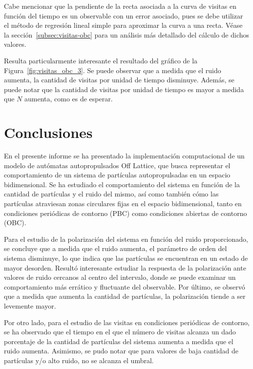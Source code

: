 \documentclass[11pt, a4paper]{article}
\begin{document}
            Cabe mencionar que la pendiente de la recta asociada a la curva de visitas en función del tiempo es un
            observable con un error asociado, pues se debe utilizar el método de regresión lineal simple para aproximar
            la curva a una recta.
            Véase la sección~\ref{subsec:visitas-obc} para un análisis más detallado del cálculo de dichos valores.

            Resulta particularmente interesante el resultado del gráfico de la Figura~\ref{fig:visitas_obc_3}.
            Se puede observar que a medida que el ruido aumenta, la cantidad de visitas por unidad de tiempo disminuye.
            Además, se puede notar que la cantidad de visitas por unidad de tiempo es mayor a medida que $N$ aumenta,
            como es de esperar.

    \newpage

    \section{Conclusiones}
    \label{sec:conclusiones}

        En el presente informe se ha presentado la implementación computacional de un modelo de autómatas autopropulsados
        Off Lattice, que busca representar el comportamiento de un sistema de partículas autopropulsadas en un espacio
        bidimensional.
        Se ha estudiado el comportamiento del sistema en función de la cantidad de partículas y el ruido del mismo, así como
        también cómo las partículas atraviesan zonas circulares fijas en el espacio bidimensional, tanto en condiciones
        periódicas de contorno (PBC) como condiciones abiertas de contorno (OBC).

        Para el estudio de la polarización del sistema en función del ruido proporcionado, se concluye que a medida que
        el ruido aumenta, el parámetro de orden del sistema disminuye, lo que indica que las partículas se encuentran en
        un estado de mayor desorden.
        Resultó interesante estudiar la respuesta de la polarización ante valores de ruido cercanos al centro del
        intervalo, donde se puede examinar un comportamiento más errático y fluctuante del observable.
        Por último, se observó que a medida que aumenta la cantidad de partículas, la polarización tiende a ser
        levemente mayor.

        Por otro lado, para el estudio de las visitas en condiciones periódicas de contorno, se ha observado que el
        tiempo en el que el número de visitas alcanza un dado porcentaje de la cantidad de partículas del sistema aumenta
        a medida que el ruido aumenta.
        Asimismo, se pudo notar que para valores de baja cantidad de partículas y/o alto ruido, no se alcanza el umbral.
\end{document}
